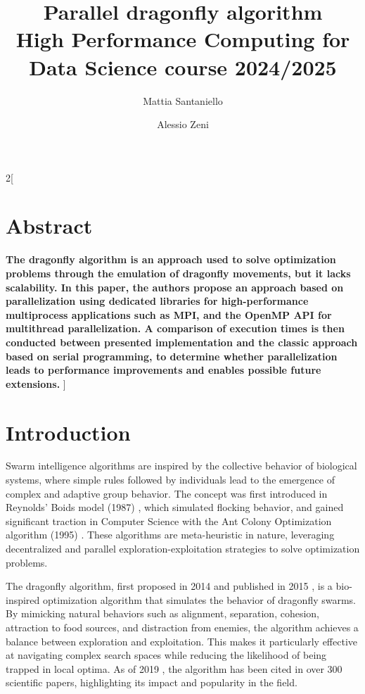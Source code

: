 \documentclass[10pt]{article}
\title{\textbf{Parallel dragonfly algorithm} %
  \\[2ex] \large High Performance Computing for Data Science course 2024/2025}
\author[1]{Mattia Santaniello}
\author[2]{Alessio Zeni}
\affil{University of Trento}
\begin{document}
\maketitle

\begin{multicols}{2}[
  \fontsize{9}{9}
  \section*{Abstract}
  \textbf{
    The dragonfly algorithm is an approach used to solve optimization problems through the emulation of dragonfly movements, but it lacks scalability.
  In this paper, the authors propose an approach based on parallelization using dedicated libraries for high-performance multiprocess applications such as MPI, and the OpenMP API for multithread parallelization.
  A comparison of execution times is then conducted between presented implementation and the classic approach based on serial programming,
  to determine whether parallelization leads to performance improvements and enables possible future extensions.
  }\newline]

\section{Introduction}
Swarm intelligence algorithms are inspired by the collective behavior of biological systems, where simple rules followed by individuals lead to the emergence of complex and adaptive group behavior.
The concept was first introduced in Reynolds' Boids model (1987) \cite{Boids}, which simulated flocking behavior, and gained significant traction in Computer Science with the Ant Colony Optimization algorithm (1995) \cite{Ant_Colony_optimization}.
These algorithms are meta-heuristic in nature, leveraging decentralized and parallel exploration-exploitation strategies to solve optimization problems.

The dragonfly algorithm, first proposed in 2014 and published in 2015 \cite{Original}, is a bio-inspired optimization algorithm that simulates the behavior of dragonfly swarms.
By mimicking natural behaviors such as alignment, separation, cohesion, attraction to food sources, and distraction from enemies, the algorithm achieves a balance between exploration and exploitation.
This makes it particularly effective at navigating complex search spaces while reducing the likelihood of being trapped in local optima.
As of 2019 \cite{Meraihi2020}, the algorithm has been cited in over 300 scientific papers, highlighting its impact and popularity in the field.


\end{multicols}
\end{document}
